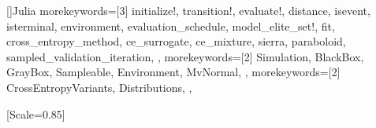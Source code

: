 \usepackage{amsmath} %
\usepackage{algorithmicx}
\usepackage{algorithm}
\usepackage{algpseudocode}
\usepackage{amsmath}
\usepackage{amsfonts}
\usepackage{siunitx}
\usepackage{commath}
\usepackage{preamble/vector} %





[]{Julia}{
    morekeywords=[3]{
      initialize!,
      transition!,
      evaluate!,
      distance,
      isevent,
      isterminal,
      environment,
      evaluation_schedule,
      model_elite_set!,
      fit,
      cross_entropy_method,
      ce_surrogate,
      ce_mixture,
      sierra,
      paraboloid,
      sampled_validation_iteration,
    },
    morekeywords=[2]{
      Simulation,
      BlackBox,
      GrayBox,
      Sampleable,
      Environment,
      MvNormal,
    },
    morekeywords=[2]{
      CrossEntropyVariants,
      Distributions,
    },
}


\usepackage{newunicodechar}
[Scale=0.85]


\DeclareMathOperator{\Var}{Var}
\DeclareMathOperator{\SD}{SD}
\DeclareMathOperator{\Ber}{Ber}
\DeclareMathOperator{\Bin}{Bin}
\DeclareMathOperator{\Poi}{Poi}
\DeclareMathOperator{\Geo}{Geo}
\DeclareMathOperator{\NegBin}{NegBin}
\DeclareMathOperator{\Uni}{Uni}
\DeclareMathOperator{\Exp}{Exp}
\DeclareMathOperator{\Dir}{Dir}
\newcommand*\Eval[1]{\left.#1\right\rvert} %
\DeclareMathOperator{\Cov}{Cov}
\DeclareMathOperator{\BetaDistribution}{Beta}
\DeclareMathOperator{\Beta}{Beta}
\DeclareMathOperator{\GammaDist}{Gamma}
\DeclareMathOperator{\Gumbel}{Gumbel}
\DeclareMathOperator{\Std}{Std}
\DeclareMathOperator{\Train}{\mathcal{D}_{\text{train}}}
\DeclareMathOperator{\Dtrain}{\mathcal{D}_{\text{train}}}
\DeclareMathOperator{\TrainLoss}{TrainLoss}
\DeclareMathOperator{\Loss}{Loss}
\DeclareMathOperator{\ZeroOneLoss}{Loss_{0\text{-}1}}
\DeclareMathOperator{\SquaredLoss}{Loss_{\text{squared}}}
\DeclareMathOperator{\AbsDevLoss}{Loss_{\text{absdev}}}
\DeclareMathOperator{\HingeLoss}{Loss_{\text{hinge}}}
\DeclareMathOperator{\LogisticLoss}{Loss_{\text{logistic}}}
\newcommand{\bfw}{\mathbf{w}}
\newcommand{\bbI}{\mathbb{I}}
\newcommand{\E}{\mathbb{E}}
\DeclareMathOperator{\Miss}{Miss}
\DeclareMathOperator{\sgn}{sgn}
\newcommand{\1}{\mathbb{1}}
\renewcommand{\v}{\mathbf{v}}
\newcommand{\V}{\mathbf{V}}
\newcommand{\w}{\mathbf{w}}
\newcommand{\h}{\mathbf{h}}
\newcommand{\M}{\mathbf{M}}
\newcommand{\m}{\mathbf{m}}
\newcommand{\B}{\mathbf{B}}
\newcommand{\e}{\mathbf{e}}
\newcommand{\bfE}{\mathbf{E}}
\newcommand{\surrogate}{\hat{S}} %
\newcommand{\Sierra}{\mathbf{M}_\mathcal{S}}

